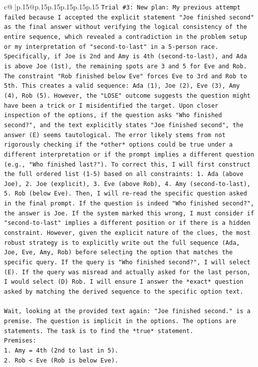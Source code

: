 \documentclass{article}
\begin{document}
{\begin{supertabular}{c@{$\;$}|p{.15\linewidth}@{}p{.15\linewidth}p{.15\linewidth}p{.15\linewidth}p{.15\linewidth}p{.15\linewidth}}
{{{\texttt{Trial \#3: New plan: My previous attempt failed because I accepted the explicit statement "Joe finished second" as the final answer without verifying the logical consistency of the entire sequence, which revealed a contradiction in the problem setup or my interpretation of "second{-}to{-}last" in a 5{-}person race. Specifically, if Joe is 2nd and Amy is 4th (second{-}to{-}last), and Ada is above Joe (1st), the remaining spots are 3 and 5 for Eve and Rob. The constraint "Rob finished below Eve" forces Eve to 3rd and Rob to 5th. This creates a valid sequence: Ada (1), Joe (2), Eve (3), Amy (4), Rob (5). However, the "LOSE" outcome suggests the question might have been a trick or I misidentified the target. Upon closer inspection of the options, if the question asks "Who finished second?", and the text explicitly states "Joe finished second", the answer (E) seems tautological. The error likely stems from not rigorously checking if the *other* options could be true under a different interpretation or if the prompt implies a different question (e.g., "Who finished last?"). To correct this, I will first construct the full ordered list (1{-}5) based on all constraints: 1. Ada (above Joe), 2. Joe (explicit), 3. Eve (above Rob), 4. Amy (second{-}to{-}last), 5. Rob (below Eve). Then, I will re{-}read the specific question asked in the final prompt. If the question is indeed "Who finished second?", the answer is Joe. If the system marked this wrong, I must consider if "second{-}to{-}last" implies a different position or if there is a hidden constraint. However, given the explicit nature of the clues, the most robust strategy is to explicitly write out the full sequence (Ada, Joe, Eve, Amy, Rob) before selecting the option that matches the specific query. If the query is "Who finished second?", I will select (E). If the query was misread and actually asked for the last person, I would select (D) Rob. I will ensure I answer the *exact* question asked by matching the derived sequence to the specific option text.} \\
\\ 
\texttt{Wait, looking at the provided text again: "Joe finished second." is a premise. The question is implicit in the options. The options are statements. The task is to find the *true* statement.} \\
\texttt{Premises:} \\
\texttt{1. Amy = 4th (2nd to last in 5).} \\
\texttt{2. Rob < Eve (Rob is below Eve).} \\
}}}
\end{supertabular}}
\end{document}
